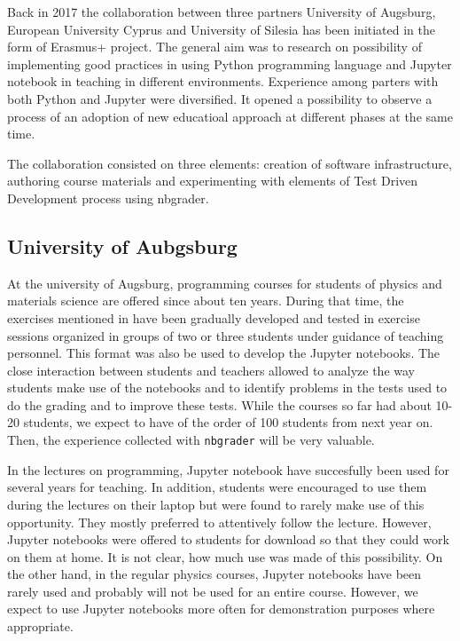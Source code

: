\documentclass[twocolumn]{svjour3}          %
\begin{document}
Back in 2017 the collaboration between three partners University of
Augsburg, European University Cyprus and University of Silesia has
been initiated in the form of Erasmus+ project. The general aim was to
research on possibility of implementing good practices in using Python
programming language and Jupyter notebook in teaching in different
environments. Experience among parters with both Python and Jupyter
were diversified. It opened a possibility to observe a process of an
adoption of new educatioal approach at different phases at the same
time.

The collaboration consisted on three elements: creation of software
infrastructure, authoring course materials and experimenting with
elements of Test Driven Development process using nbgrader.


\subsection{University of Aubgsburg} 

At the university of Augsburg, programming courses for students of physics and
materials science are offered since about ten years. During that time, the
exercises mentioned in \label{sec:nbgrader} have been gradually developed and
tested in exercise sessions organized in groups of two or three students under
guidance of teaching personnel. This format was also be used to develop the
Jupyter notebooks. The close interaction between students and teachers allowed
to analyze the way students make use of the notebooks and to identify problems
in the tests used to do the grading and to improve these tests. While the courses
so far had about 10-20 students, we expect to have of the order of 100 students
from next year on. Then, the experience collected with \texttt{nbgrader} will
be very valuable.

In the lectures on programming, Jupyter notebook have succesfully been used for
several years for teaching. In addition, students were encouraged to use them
during the lectures on their laptop but were found to rarely make use of this
opportunity. They mostly preferred to attentively follow the lecture. However,
Jupyter notebooks were offered to students for download so that they could
work on them at home. It is not clear, how much use was made of this possibility.
On the other hand, in the regular physics courses, Jupyter notebooks have been
rarely used and probably will not be used for an entire course. However, we
expect to use Jupyter notebooks more often for demonstration purposes where
appropriate.
\end{document}
